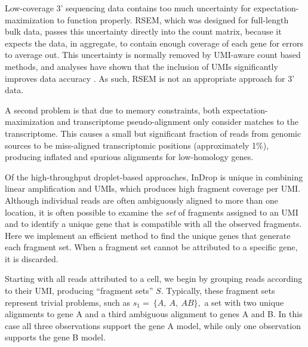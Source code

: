 Low-coverage 3' sequencing data contains too much uncertainty for expectation-maximization to function properly. 
RSEM, which was designed for full-length bulk data, passes this uncertainty directly into the count matrix, because it expects the data, in aggregate, to contain enough coverage of each gene for errors to average out. 
This uncertainty is normally removed by UMI-aware count based methods, and analyses have shown that the inclusion of UMIs significantly improves data accuracy \citep{Grun2016}.
As such, RSEM is not an appropriate approach for 3' data. 

A second problem is that due to memory constraints, both expectation-maximization and transcriptome pseudo-alignment only consider matches to the transcriptome. 
This causes a small but significant fraction of reads from genomic sources to be miss-aligned transcriptomic positions (approximately 1\%), producing inflated and spurious alignments for low-homology genes.

Of the high-throughput droplet-based approaches, InDrop is unique in combining linear amplification and UMIs, which produces high fragment coverage per UMI\@. 
Although individual reads are often ambiguously aligned to more than one location, it is often possible to examine the \textit{set} of fragments assigned to an UMI and to identify a unique gene that is compatible with all the observed fragments. 
Here we implement an efficient method to find the unique genes that generate each fragment set. 
When a fragment set cannot be attributed to a specific gene, it is discarded.

Starting with all reads attributed to a cell, we begin by grouping reads according to their UMI, producing ``fragment sets'' \(S\). 
Typically, these fragment sets represent trivial problems, such as \(s_{1} = \ \{ A,\ A,\ AB\},\) a set with two unique alignments to gene A and a third ambiguous alignment to genes A and B. 
In this case all three observations support the gene A model, while only one observation supports the gene B model.

